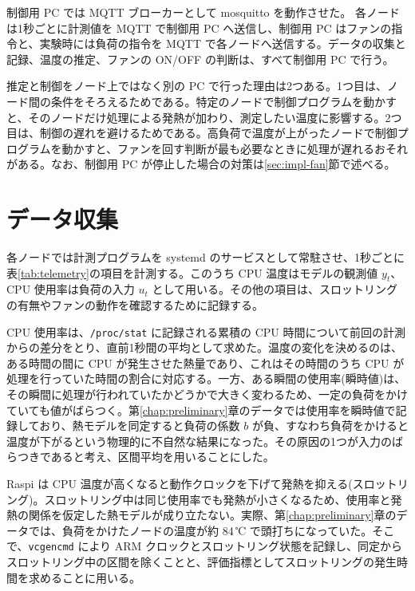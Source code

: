 制御用 PC では MQTT ブローカーとして mosquitto を動作させた。
各ノードは1秒ごとに計測値を MQTT で制御用 PC へ送信し、制御用 PC はファンの指令と、実験時には負荷の指令を MQTT で各ノードへ送信する。データの収集と記録、温度の推定、ファンの ON/OFF の判断は、すべて制御用 PC で行う。

推定と制御をノード上ではなく別の PC で行った理由は2つある。1つ目は、ノード間の条件をそろえるためである。特定のノードで制御プログラムを動かすと、そのノードだけ処理による発熱が加わり、測定したい温度に影響する。2つ目は、制御の遅れを避けるためである。高負荷で温度が上がったノードで制御プログラムを動かすと、ファンを回す判断が最も必要なときに処理が遅れるおそれがある。なお、制御用 PC が停止した場合の対策は\ref{sec:impl-fan}節で述べる。




\section{データ収集}\label{sec:impl-collect}
各ノードでは計測プログラムを systemd のサービスとして常駐させ、1秒ごとに表\ref{tab:telemetry}の項目を計測する。このうち CPU 温度はモデルの観測値 $y_t$、CPU 使用率は負荷の入力 $u_t$ として用いる。その他の項目は、スロットリングの有無やファンの動作を確認するために記録する。

CPU 使用率は、\texttt{/proc/stat} に記録される累積の CPU 時間について前回の計測からの差分をとり、直前1秒間の平均として求めた。温度の変化を決めるのは、ある時間の間に CPU が発生させた熱量であり、これはその時間のうち CPU が処理を行っていた時間の割合に対応する。一方、ある瞬間の使用率(瞬時値)は、その瞬間に処理が行われていたかどうかで大きく変わるため、一定の負荷をかけていても値がばらつく。第\ref{chap:preliminary}章のデータでは使用率を瞬時値で記録しており、熱モデルを同定すると負荷の係数 $b$ が負、すなわち負荷をかけると温度が下がるという物理的に不自然な結果になった。その原因の1つが入力のばらつきであると考え、区間平均を用いることにした。

Raspi は CPU 温度が高くなると動作クロックを下げて発熱を抑える(スロットリング)。スロットリング中は同じ使用率でも発熱が小さくなるため、使用率と発熱の関係を仮定した熱モデルが成り立たない。実際、第\ref{chap:preliminary}章のデータでは、負荷をかけたノードの温度が約 84\,℃ で頭打ちになっていた。そこで、\texttt{vcgencmd} により ARM クロックとスロットリング状態を記録し、同定からスロットリング中の区間を除くことと、評価指標としてスロットリングの発生時間を求めることに用いる。

